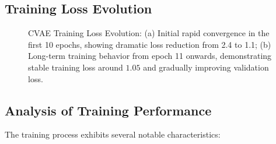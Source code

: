 \documentclass{article}
\begin{document}
\subsection{Training Loss Evolution}
\begin{figure}[H]
    \centering
    \caption{CVAE Training Loss Evolution: (a) Initial rapid convergence in the first 10 epochs, showing dramatic loss reduction from 2.4 to 1.1; (b) Long-term training behavior from epoch 11 onwards, demonstrating stable training loss around $1.05$ and gradually improving validation loss.}
    \label{fig:learning_curves}
\end{figure}

\subsection{Analysis of Training Performance}
The training process exhibits several notable characteristics:
\end{document}
